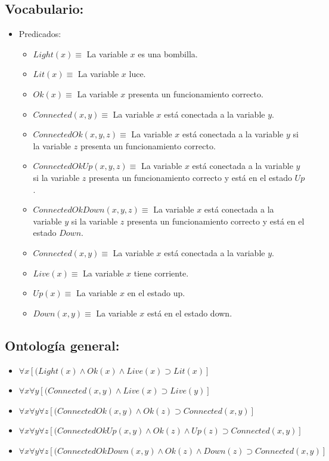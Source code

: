 \documentclass[10pt, a4paper,spanish]{article}
\begin{document}
		\subsection{Vocabulario:}
			\begin{itemize}
				\item Predicados:
				\begin{itemize}
					\item $Light(x) \equiv$ La variable $x$ es una bombilla.
					\item $Lit(x) \equiv$ La variable $x$ luce.
					\item $Ok(x) \equiv$ La variable $x$ presenta un funcionamiento correcto.
					\item $Connected(x, y) \equiv$ La variable $x$ está conectada a la variable $y$.
					\item $ConnectedOk(x, y, z) \equiv$ La variable $x$ está conectada a la variable $y$ si la variable $z$ presenta un funcionamiento correcto.
					\item $ConnectedOkUp(x, y, z) \equiv$ La variable $x$ está conectada a la variable $y$ si la variable $z$ presenta un funcionamiento correcto y está en el estado $Up$.
					\item $ConnectedOkDown(x, y, z) \equiv$ La variable $x$ está conectada a la variable $y$ si la variable $z$ presenta un funcionamiento correcto y está en el estado $Down$.
					\item $Connected(x, y) \equiv$ La variable $x$ está conectada a la variable $y$.
					\item $Live(x) \equiv$ La variable $x$ tiene corriente.
					\item $Up(x) \equiv$ La variable $x$ en el estado up.
					\item $Down(x, y) \equiv$ La variable $x$ está en el estado down.
				\end{itemize}
			\end{itemize}

		\subsection{Ontología general:}

			\begin{itemize}
				\item $ \forall x [(Light(x) \land Ok(x) \land Live(x) \supset Lit(x)] $
				\item $ \forall x \forall y [(Connected(x, y) \land Live(x) \supset Live(y)] $
				\item $ \forall x \forall y \forall z [(ConnectedOk(x, y) \land Ok(z) \supset Connected(x, y)] $
				\item $ \forall x \forall y \forall z [(ConnectedOkUp(x, y) \land Ok(z) \land Up(z) \supset Connected(x, y)] $
				\item $ \forall x \forall y \forall z [(ConnectedOkDown(x, y) \land Ok(z) \land Down(z) \supset Connected(x, y)] $

			\end{itemize}
\end{document}
